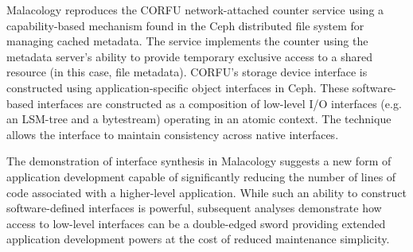Malacology reproduces the CORFU network-attached counter service using a
capability-based mechanism found in the Ceph distributed file system for
managing cached metadata. The service implements the counter using the metadata server's ability to provide temporary
exclusive access to a shared resource (in this case, file metadata). CORFU's storage device interface is
constructed using application-specific object interfaces in Ceph. These
software-based interfaces are constructed as a composition of low-level I/O
interfaces (e.g. an LSM-tree and a bytestream) operating in an atomic
context. The technique allows the interface to maintain consistency across native
interfaces.

The demonstration of interface synthesis in Malacology suggests a new form of
application development capable of significantly reducing the number of lines of code associated with a higher-level application.
While such an ability to construct software-defined interfaces is powerful,
subsequent analyses demonstrate how access to low-level interfaces can be a double-edged
sword providing extended application development powers at the cost of reduced maintenance simplicity.
